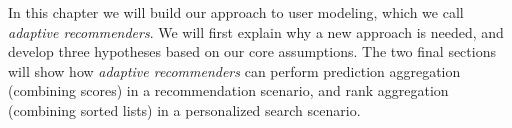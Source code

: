 \label{chap:methods}

In this chapter we will build our approach to user modeling, which we call \emph{adaptive recommenders}.
We will first explain why a new approach is needed, and develop three hypotheses based on our core assumptions.
The two final sections will show how \emph{adaptive recommenders}
can perform prediction aggregation (combining scores) in a recommendation scenario,
and rank aggregation (combining sorted lists) in a personalized search scenario.








%

